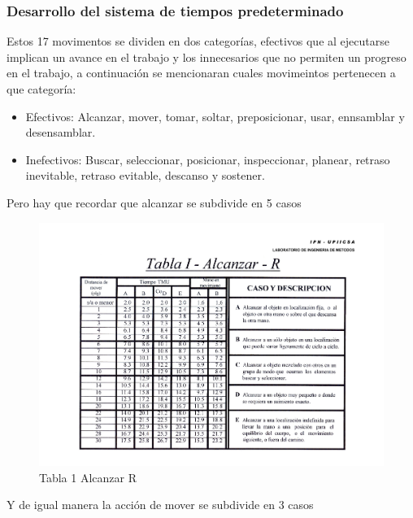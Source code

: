     \subsubsection{Desarrollo del sistema de tiempos predeterminado}
    Estos 17 movimentos se dividen en dos categorías, efectivos que al ejecutarse implican un avance en el trabajo y los innecesarios que no permiten un progreso en el trabajo, a continuación se mencionaran cuales movimeintos pertenecen a que categoría: 
    \begin{itemize}
        \item Efectivos: Alcanzar, mover, tomar, soltar, preposicionar, usar, ennsamblar y desensamblar.
        \item Inefectivos: Buscar, seleccionar, posicionar, inspeccionar, planear, retraso inevitable, retraso evitable, descanso y sostener.\cite{IngenieriaIndustrial}
    \end{itemize}
    
    Pero hay que recordar que alcanzar se subdivide en 5 casos
    
    \begin{figure}[H]
        \centering
        \includegraphics[scale=0.150]{21/img/tabla1AlcanzarR.pdf}
        \caption{Tabla 1 Alcanzar R}
        \label{fig:tabla1AlcanzarR}
    \end{figure}
    
    Y de igual manera la acción de mover se subdivide en 3 casos
    
